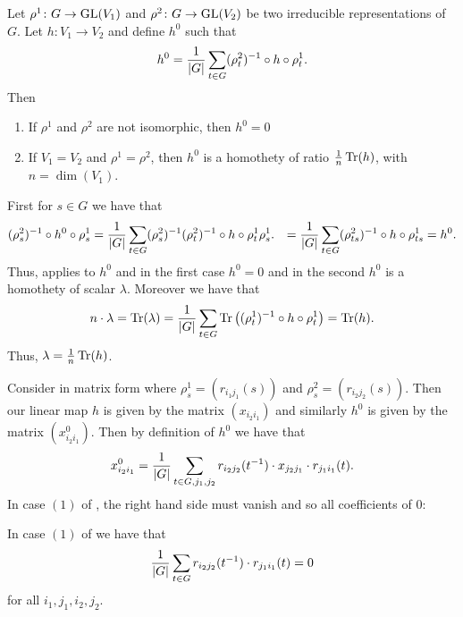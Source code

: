 \documentclass[letterpaper, 11pt, oneside]{book}
\begin{document}
\begin{cor}\label{cor:schurs_lemma_cor_1}
  Let $\rho^{1}\colon G \to \operatorname{GL}(V_{1})$ and $\rho^{2}\colon G \to \operatorname{GL}(V_{2})$ be two irreducible representations of $G$.
  Let $h \colon V_{1} \to V_{2}$ and define $h^{0}$ such that
  \[
    h^{0} = \frac{1}{\abs{G}} \sum_{t \in G} (\rho_{t}^{2})^{-1} \circ h \circ \rho_{t}^{1}.
  \]
  Then
  \begin{enumerate}
  \item If $\rho^{1}$ and $\rho^{2}$ are not isomorphic, then $h^{0} = 0$
  \item If $V_{1} = V_{2}$ and $\rho^{1} = \rho^{2}$, then $h^{0}$ is a homothety of ratio $\frac{1}{n} \Tr(h)$, with $n = \dim(V_{1})$.
  \end{enumerate}
\end{cor}
\begin{pf}
  First for $s \in G$ we have that
  \begin{align*}
    (\rho_{s}^{2})^{-1} \circ h^{0} \circ \rho_{s}^{1} &= \frac{1}{\abs{G}} \sum_{t \in G} (\rho_{s}^{2})^{-1} (\rho_{t}^{2})^{-1} \circ h \circ \rho_{t}^{1} \rho_{s}^{1}.
                                                       &= \frac{1}{\abs{G}} \sum_{t \in G} (\rho_{ts}^{2})^{-1} \circ h \circ \rho_{ts}^{1} = h^{0}.
  \end{align*}
  Thus,  applies to $h^{0}$ and in the first case $h^{0} = 0$ and in the second $h^{0}$ is a homothety of scalar $\lambda$.
  Moreover we have that
  \[
    n \cdot \lambda = \Tr(\lambda) = \frac{1}{\abs{G}} \sum_{t \in G} \Tr\pqty{(\rho_{t}^{1})^{-1} \circ h \circ \rho_{t}^{1}} = \Tr(h).
  \]
  Thus, $\lambda = \frac{1}{n} \Tr(h)$.
\end{pf}

Consider  in matrix form where $\rho^{1}_{s} = (r_{i_{1}j_{1}}(s))$ and $\rho^{2}_{s} = (r_{i_{2}j_{2}}(s))$.
Then our linear map $h$ is given by the matrix $(x_{i_{2}i_{1}})$ and similarly $h^{0}$ is given by the matrix $(x^{0}_{i_{2}i_{1}})$.
Then by definition of $h^{0}$ we have that
\[
  x^{0}_{i_{2}i_{1}} = \frac{1}{\abs{G}} \sum_{t \in G, j_{1}, j_{2}} r_{i_{2}j_{2}}(t^{-1}) \cdot x_{j_{2}j_{1}} \cdot r_{j_{1}i_{1}}(t).
\]
In case $(1)$ of , the right hand side must vanish and so all coefficients of $0$:
\begin{cor}\label{cor:schurs_lemma_cor_2}
  In case $(1)$ of  we have that
  \[
    \frac{1}{\abs{G}} \sum_{t \in G} r_{i_{2}j_{2}}(t^{-1}) \cdot r_{j_{1}i_{1}}(t) = 0
  \]
  for all $i_{1}, j_{1}, i_{2}, j_{2}$.
\end{cor}
\end{document}
